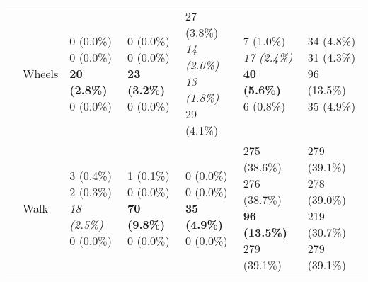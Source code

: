 \begin{table}
\begin{center}
\begin{small}
\begin{tabular}{lllllll}
& Wheels      &  \makecell[l]{\textnormal{0 (0.0\%)} \\\textnormal{0 (0.0\%)} \\\textbf{20 (2.8\%)} \\\textnormal{0 (0.0\%)}}      &  \makecell[l]{\textnormal{0 (0.0\%)} \\\textnormal{0 (0.0\%)} \\\textbf{23 (3.2\%)} \\\textnormal{0 (0.0\%)}}      &  \makecell[l]{\textnormal{27 (3.8\%)} \\\textit{14 (2.0\%)} \\\textit{13 (1.8\%)} \\\textnormal{29 (4.1\%)}}      &  \makecell[l]{\textnormal{7 (1.0\%)} \\\textit{17 (2.4\%)} \\\textbf{40 (5.6\%)} \\\textnormal{6 (0.8\%)}}      & \makecell[l]{34 (4.8\%) \\31 (4.3\%) \\96 (13.5\%) \\35 (4.9\%) \\} \\ \cline{2-7}
& Walk      &  \makecell[l]{\textnormal{3 (0.4\%)} \\\textnormal{2 (0.3\%)} \\\textit{18 (2.5\%)} \\\textnormal{0 (0.0\%)}}      &  \makecell[l]{\textnormal{1 (0.1\%)} \\\textnormal{0 (0.0\%)} \\\textbf{70 (9.8\%)} \\\textnormal{0 (0.0\%)}}      &  \makecell[l]{\textnormal{0 (0.0\%)} \\\textnormal{0 (0.0\%)} \\\textbf{35 (4.9\%)} \\\textnormal{0 (0.0\%)}}      &  \makecell[l]{\textnormal{275 (38.6\%)} \\\textnormal{276 (38.7\%)} \\\textbf{96 (13.5\%)} \\\textnormal{279 (39.1\%)}}      & \makecell[l]{279 (39.1\%) \\278 (39.0\%) \\219 (30.7\%) \\279 (39.1\%) \\} \\ \cline{2-7}

\end{tabular}
\end{small}
\end{center}
\end{table}
